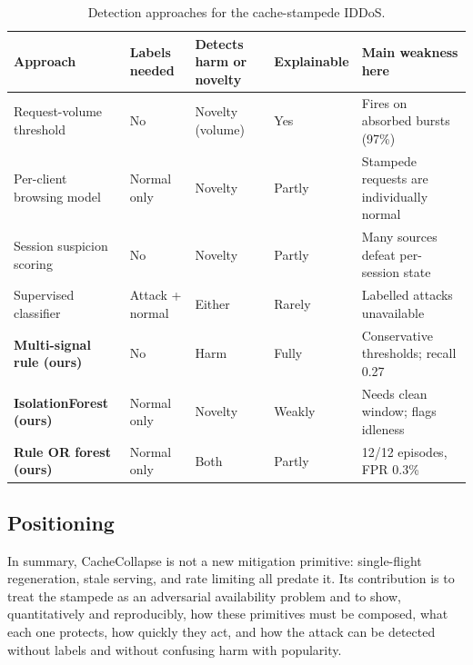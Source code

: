 \begin{table}[t]
\centering
\caption{Detection approaches for the cache-stampede IDDoS.}
\label{tab:detcompare}
\footnotesize
\begin{tabularx}{\linewidth}{@{}L{3.2cm}L{1.7cm}L{1.8cm}L{1.8cm}Y@{}}
\toprule
Approach & Labels needed & Detects harm or novelty & Explainable & Main weakness here \\
\midrule
Request-volume threshold & No & Novelty (volume) & Yes & Fires on absorbed bursts (97\%) \\
Per-client browsing model \cite{xie2009} & Normal only & Novelty & Partly & Stampede requests are individually normal \\
Session suspicion scoring \cite{ranjan2009} & No & Novelty & Partly & Many sources defeat per-session state \\
Supervised classifier & Attack + normal & Either & Rarely & Labelled attacks unavailable \\
\textbf{Multi-signal rule (ours)} & No & Harm & Fully & Conservative thresholds; recall 0.27 \\
\textbf{IsolationForest (ours)} & Normal only & Novelty & Weakly & Needs clean window; flags idleness \\
\textbf{Rule OR forest (ours)} & Normal only & Both & Partly & 12/12 episodes, FPR 0.3\% \\
\bottomrule
\end{tabularx}
\end{table}

\subsection{Positioning}
In summary, CacheCollapse is not a new mitigation primitive: single-flight
regeneration, stale serving, and rate limiting all predate it. Its contribution is to
treat the stampede as an adversarial availability problem and to show,
quantitatively and reproducibly, how these primitives must be composed, what each one
protects, how quickly they act, and how the attack can be detected without labels and
without confusing harm with popularity.
